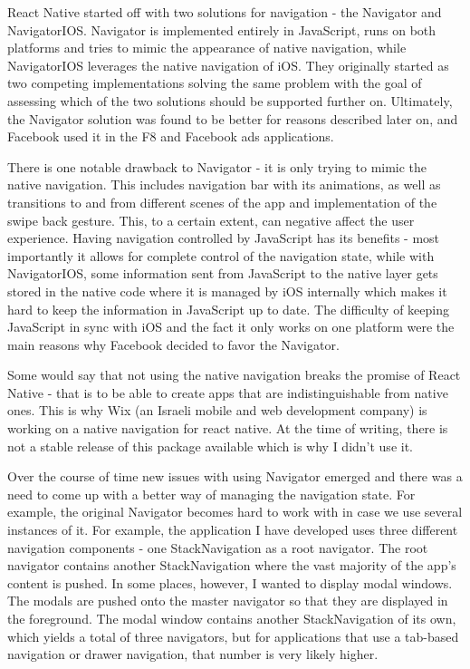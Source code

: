React Native started off with two solutions for navigation - the Navigator and NavigatorIOS. Navigator is implemented entirely in JavaScript, runs on both platforms and tries to mimic the appearance of native navigation, while NavigatorIOS leverages the native navigation of iOS.
They originally started as two competing implementations solving the same problem \cite{rn:navigation}  with the goal of assessing which of the two solutions should be supported further on. Ultimately, the Navigator solution was found to be better for reasons described later on, and Facebook used it in the F8 and Facebook ads applications. 


There is one notable drawback to Navigator - it is only trying to mimic the native navigation. This includes navigation bar with its animations, as well as transitions to and from different scenes of the app and implementation of the swipe back gesture. This, to a certain extent, can negative affect the user experience.
Having navigation controlled by JavaScript has its benefits - most importantly it allows for complete control of the navigation state, while with NavigatorIOS, some information sent from JavaScript to the native layer gets stored in the native code where it is managed by iOS internally which makes it hard to keep the information in JavaScript up to date. The difficulty of keeping JavaScript in sync with iOS and the fact it only works on one platform were the main reasons why Facebook decided to favor the Navigator.

Some would say that not using the native navigation breaks the promise of React Native - that is to be able to create apps that are indistinguishable from native ones. This is why Wix (an Israeli mobile and web development company) is working on a native navigation for react native. At the time of writing, there is not a stable release of this package available which is why I didn't use it.

Over the course of time new issues with using Navigator emerged and there was a need to come up with a better way of managing the navigation state. For example, the original Navigator becomes hard to work with in case we use several instances of it. For example, the application I have developed uses three different navigation components - one StackNavigation as a root navigator. The root navigator contains another StackNavigation where the vast majority of the app's content is pushed. In some places, however, I wanted to display modal windows. The modals are pushed onto the master navigator so that they are displayed in the foreground. The modal window contains another StackNavigation of its own, which yields a total of three navigators, but for applications that use a tab-based navigation or drawer navigation, that number is very likely higher. 


